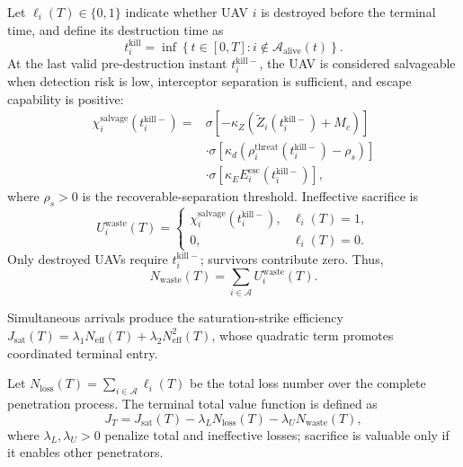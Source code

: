 \documentclass{cja}
\begin{document}
Let $\ell_i(T)\in\{0,1\}$ indicate whether UAV $i$ is destroyed before the terminal time, and define its destruction time as
\begin{equation}
t_i^{\mathrm{kill}}
=
\inf\left\{
t\in[0,T]:
i\notin\mathcal A_{\mathrm{alive}}(t)
\right\}.
\end{equation}
At the last valid pre-destruction instant $t_i^{\mathrm{kill}-}$, the UAV is considered salvageable when detection risk is low, interceptor separation is sufficient, and escape capability is positive:
\begin{equation}
\begin{aligned}
\chi_i^{\mathrm{salvage}}\!\left(t_i^{\mathrm{kill}-}\right)
={}&
\sigma\!\left[-\kappa_Z\left(\widetilde Z_i\!\left(t_i^{\mathrm{kill}-}\right)+M_c\right)\right]\\
&\cdot
\sigma\!\left[\kappa_d\left(\rho_i^{\mathrm{threat}}\!\left(t_i^{\mathrm{kill}-}\right)-\rho_s\right)\right]\\
&\cdot
\sigma\!\left[\kappa_E E_i^{\mathrm{esc}}\!\left(t_i^{\mathrm{kill}-}\right)\right],
\end{aligned}
\end{equation}
where $\rho_s>0$ is the recoverable-separation threshold. Ineffective sacrifice is
\begin{equation}
U_i^{\mathrm{waste}}(T)
=
\begin{cases}
\chi_i^{\mathrm{salvage}}\!\left(t_i^{\mathrm{kill}-}\right),
&
\ell_i(T)=1,\\[2mm]
0,
&
\ell_i(T)=0.
\end{cases}
\end{equation}
Only destroyed UAVs require $t_i^{\mathrm{kill}-}$; survivors contribute zero. Thus,
\begin{equation}
N_{\mathrm{waste}}(T)
=
\sum_{i\in\mathcal{A}} U_i^{\mathrm{waste}}(T).
\end{equation}

Simultaneous arrivals produce the saturation-strike efficiency $J_{\mathrm{sat}}(T)=\lambda_1N_{\mathrm{eff}}(T)+\lambda_2N_{\mathrm{eff}}^2(T)$, whose quadratic term promotes coordinated terminal entry.

Let $N_{\mathrm{loss}}(T)=\sum_{i\in\mathcal{A}}\ell_i(T)$ be the total loss number over the complete penetration process. The terminal total value function is defined as
\begin{equation}
J_T
=
J_{\mathrm{sat}}(T)
-
\lambda_L N_{\mathrm{loss}}(T)
-
\lambda_U N_{\mathrm{waste}}(T),
\end{equation}
where $\lambda_L,\lambda_U>0$ penalize total and ineffective losses; sacrifice is valuable only if it enables other penetrators.
\end{document}
